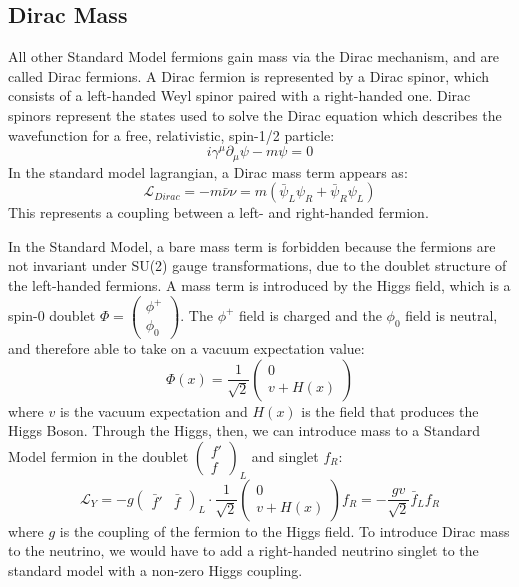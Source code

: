 \documentclass[/main.tex]{subfiles}
\begin{document}
\subsection{Dirac Mass} \label{sec:diracmass}
All other Standard Model fermions gain mass via the Dirac mechanism, and are called Dirac fermions\cite{Dirac1928}.
A Dirac fermion is represented by a Dirac spinor, which consists of a left-handed Weyl spinor paired with a right-handed one.
Dirac spinors represent the states used to solve the Dirac equation which describes the wavefunction for a free, relativistic, spin-1/2 particle:
\begin{equation}
  i\gamma^\mu \partial_\mu \psi - m\psi = 0
\end{equation}
In the standard model lagrangian, a Dirac mass term appears as:
\begin{equation}
  \mathcal{L}_{Dirac}=-m\bar\nu\nu=m(\bar\psi_L\psi_R+\bar\psi_R\psi_L)
\end{equation}
This represents a coupling between a left- and right-handed fermion.

In the Standard Model, a bare mass term is forbidden because the fermions are not invariant under SU(2) gauge transformations, due to the doublet structure of the left-handed fermions.
A mass term is introduced by the Higgs field, which is a spin-0 doublet $\Phi=\begin{pmatrix} \phi^+ \\ \phi_0\end{pmatrix}$.
The $\phi^+$ field is charged and the $\phi_0$ field is neutral, and therefore able to take on a vacuum expectation value:
\begin{equation}
  \Phi(x)=\frac{1}{\sqrt{2}}\begin{pmatrix}  0\\ v+H(x)\end{pmatrix}
\end{equation}
where $v$ is the vacuum expectation and $H(x)$ is the field that produces the Higgs Boson.
Through the Higgs, then, we can introduce mass to a Standard Model fermion in the doublet $\begin{pmatrix}f' \\ f\end{pmatrix}_L$ and singlet $f_R$:
\begin{equation}
  \mathcal{L}_{Y}=-g\begin{pmatrix}\bar f' & \bar f\end{pmatrix}_L \cdot\frac{1}{\sqrt{2}}\begin{pmatrix}0 \\ v+H(x)\end{pmatrix} f_R = -\frac{gv}{\sqrt{2}}\bar f_Lf_R
\end{equation}
where $g$ is the coupling of the fermion to the Higgs field.
To introduce Dirac mass to the neutrino, we would have to add a right-handed neutrino singlet to the standard model with a non-zero Higgs coupling.
\end{document}
